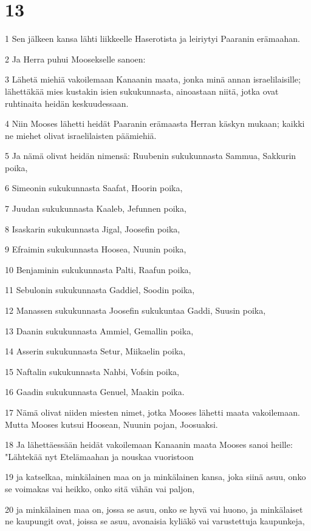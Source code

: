 \chapter{13}

\par 1 Sen jälkeen kansa lähti liikkeelle Haserotista ja leiriytyi Paaranin erämaahan.
\par 2 Ja Herra puhui Moosekselle sanoen:
\par 3 Lähetä miehiä vakoilemaan Kanaanin maata, jonka minä annan israelilaisille; lähettäkää mies kustakin isien sukukunnasta, ainoastaan niitä, jotka ovat ruhtinaita heidän keskuudessaan.
\par 4 Niin Mooses lähetti heidät Paaranin erämaasta Herran käskyn mukaan; kaikki ne miehet olivat israelilaisten päämiehiä.
\par 5 Ja nämä olivat heidän nimensä: Ruubenin sukukunnasta Sammua, Sakkurin poika,
\par 6 Simeonin sukukunnasta Saafat, Hoorin poika,
\par 7 Juudan sukukunnasta Kaaleb, Jefunnen poika,
\par 8 Isaskarin sukukunnasta Jigal, Joosefin poika,
\par 9 Efraimin sukukunnasta Hoosea, Nuunin poika,
\par 10 Benjaminin sukukunnasta Palti, Raafun poika,
\par 11 Sebulonin sukukunnasta Gaddiel, Soodin poika,
\par 12 Manassen sukukunnasta Joosefin sukukuntaa Gaddi, Suusin poika,
\par 13 Daanin sukukunnasta Ammiel, Gemallin poika,
\par 14 Asserin sukukunnasta Setur, Miikaelin poika,
\par 15 Naftalin sukukunnasta Nahbi, Vofsin poika,
\par 16 Gaadin sukukunnasta Genuel, Maakin poika.
\par 17 Nämä olivat niiden miesten nimet, jotka Mooses lähetti maata vakoilemaan. Mutta Mooses kutsui Hoosean, Nuunin pojan, Joosuaksi.
\par 18 Ja lähettäessään heidät vakoilemaan Kanaanin maata Mooses sanoi heille: "Lähtekää nyt Etelämaahan ja nouskaa vuoristoon
\par 19 ja katselkaa, minkälainen maa on ja minkälainen kansa, joka siinä asuu, onko se voimakas vai heikko, onko sitä vähän vai paljon,
\par 20 ja minkälainen maa on, jossa se asuu, onko se hyvä vai huono, ja minkälaiset ne kaupungit ovat, joissa se asuu, avonaisia kyliäkö vai varustettuja kaupunkeja,
